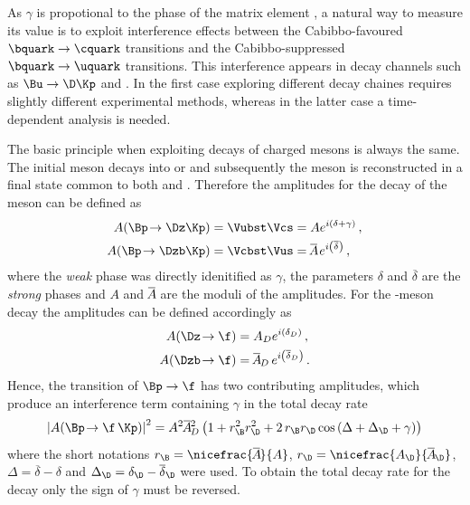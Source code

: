As $\gamma$ is propotional to the phase of the matrix element \Vub, a natural way to measure its value is to exploit interference effects between the Cabibbo-favoured $\bquark\to\cquark$ transitions and the Cabibbo-suppressed $\bquark\to\uquark$ transitions.
This interference appears in decay channels such as $\Bu\to\D\Kp$ and \BsToDsK.
In the first case exploring different \D decay chaines requires slightly different experimental methods, whereas in the latter case a time-dependent analysis is needed.

The basic principle when exploiting decays of charged \B mesons is always the same.
The initial \Bpm meson decays into \Dz\Kpm or \Dzb\Kpm and subsequently the \D meson is reconstructed in a final state common to both \Dz and \Dzb.
Therefore the amplitudes for the decay of the \B meson can be defined as
\begin{equation}
\begin{aligned}
A\!\left(\Bp\!\to\Dz\Kp\right)&=\Vubst\Vcs=Ae^{i\left(\delta+\gamma\right)}\,,\\
A\!\left(\Bp\!\to\Dzb\Kp\right)&=\Vcbst\Vus=\overline{\kern -1.0pt A\kern -1.0pt}\,e^{i\left(\overline{\delta}\right)}\,,
\end{aligned}
\end{equation}
where the \emph{weak} phase was directly idenitified as $\gamma$, the parameters $\delta$ and $\overline{\delta}$ are the \emph{strong} phases and $A$ and $\overline{\kern -1.0pt A\kern -1.0pt}$ are the moduli of the amplitudes.
For the \D-meson decay the amplitudes can be defined accordingly as
\begin{equation}
\begin{aligned}
A\!\left(\Dz\!\to\f\right)&=A_De^{i\left(\delta_D\right)}\,,\\
A\!\left(\Dzb\!\to\f\right)&=\overline{\kern -1.0pt A\kern -1.0pt}_D\,e^{i\left(\overline{\delta}_D\right)}\,.
\end{aligned}
\end{equation}
Hence, the transition of $\Bp\to\f$ has two contributing amplitudes, which produce an interference term containing $\gamma$ in the total decay rate
\begin{equation}
\left|A\!\left(\Bp\!\to\f\,\Kp\right)\right|^2=A^2\overline{\kern -1.0pt A\kern -1.0pt}{}_D^2\left(1+r_\B^2r_\D^2+2\,r_\B r_\D\cos\left(\Delta+\Delta_\D+\gamma\right)\right)\label{eq:totDecRateChargedB}
\end{equation}
where the short notations $r_\B=\nicefrac{\overline{\kern -1.0pt A\kern -1.0pt}}{A}$, $r_\D=\nicefrac{A_\D}{\overline{\kern -1.0pt A\kern -1.0pt}_\D}$, $\Delta=\overline{\delta}-\delta$ and $\Delta_\D=\delta_\D-\overline{\delta}_\D$ were used.
To obtain the total decay rate for the \Bm decay only the sign of $\gamma$ must be reversed.

